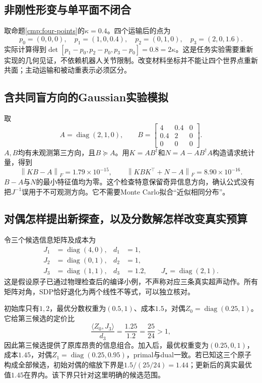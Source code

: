 \documentclass[11pt,a4paper]{article}
\numberwithin{equation}{section}
\theoremstyle{definition}
\DeclareMathOperator{\diag}{diag}
\newcommand{\norm}[1]{\left\lVert#1\right\rVert}
\begin{document}
\subsection{非刚性形变与单平面不闭合}
取命题\ref{cmp:four-points}的$\kappa=0.4$。四个运输后的点为
\begin{equation}
 p_0=(0,0,0),\quad p_1=(1,0,0.4),\quad
 p_2=(0,1,0),\quad p_3=(2,0,1.6).
\end{equation}
实际计算得到$\det[p_1-p_0,p_2-p_0,p_3-p_0]=0.8=2\kappa$。这是任务实验需要重新实现的几何见证，不依赖机器人关节限制。改变材料坐标并不能让四个世界点重新共面；主动运输和被动重表示必须区分。

\subsection{含共同盲方向的Gaussian实验模拟}
取
\begin{equation}
 A=\diag(2,1,0),\qquad
 B=\begin{bmatrix}4&0.4&0\\0.4&2&0\\0&0&0\end{bmatrix}.
\end{equation}
$A,B$均有未观测第三方向，且$B\succeq A$。用$K=AB^\dagger$和$N=A-AB^\dagger A$构造请求统计量，得到
\begin{equation}
 \norm{KB-A}_F=1.79\times10^{-15},\qquad
 \norm{KBK^\top+N-A}_F=8.90\times10^{-16}.
\end{equation}
$B-A$与$N$的最小特征值均为零。这个检查特意保留奇异信息方向，确认公式没有把$J^{-1}$误用于不可观测方向。它不需要Monte Carlo拟合“近似相同分布”。

\subsection{对偶怎样提出新探查，以及分数解怎样改变真实预算}
令三个候选信息矩阵及成本为
\begin{align}
 J_1&=\diag(4,0),&d_1&=1,\\
 J_2&=\diag(0,1),&d_2&=1,\\
 J_3&=\diag(1,1),&d_3&=1.2,
 \qquad J_\star=\diag(2,1).
\end{align}
这是假设原子已通过物理检查后的编译小例，不声称对应三条真实超声动作。所有矩阵对角，SDP恰好退化为两个线性不等式，可以独立核对。

初始库只有$1,2$，最优分数权重为$(0.5,1)$、成本$1.5$，对偶$Z_0=\diag(0.25,1)$。它给第三候选的定价比
\begin{equation}
 \frac{\langle Z_0,J_3\rangle}{d_3}
 =\frac{1.25}{1.2}=\frac{25}{24}>1,
\end{equation}
因此第三候选提供了原库昂贵的信息组合。加入后，最优权重变为$(0.25,0,1)$，成本$1.45$，对偶$Z_1=\diag(0.25,0.95)$，primal与dual一致。若已知这三个原子构成全部候选，初始对偶的缩放下界是$1.5/(25/24)=1.44$；更新后的真实最优值$1.45$在界内。该下界只针对这里明确的候选范围。
\end{document}
